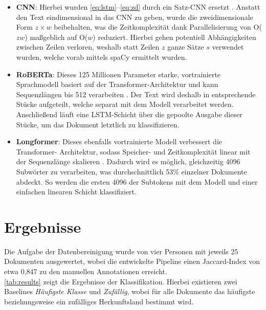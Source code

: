 \documentclass[bachelor,german]{info1thesis}
\begin{document}
\begin{itemize}
\item \textbf{CNN}: Hierbei wurden \autoref{eq:lstm}--\ref{eq:zd} durch ein Satz-CNN ersetzt \cite{Kim2014}. Anstatt den Text eindimensional in das CNN zu geben, wurde die zweidimensionale Form $z \times w$ beibehalten, was die Zeitkomplexität dank Parallelisierung von O($zw$) maßgeblich auf O($w$) reduziert. Hierbei gehen potentiell Abhängigkeiten zwischen Zeilen verloren, weshalb statt Zeilen $z$ ganze Sätze $s$ verwendet wurden, welche vorab mittels spaCy ermittelt wurden.
\item \textbf{RoBERTa}: Dieses 125 Millionen Parameter starke, vortrainierte Sprachmodell basiert auf der Transformer-Architektur und kann Sequenzlängen bis 512 verarbeiten \cite{Liu2019}. Der Text wird deshalb in entsprechende Stücke aufgeteilt, welche separat mit dem Modell verarbeitet werden. Anschließend läuft eine LSTM-Schicht über die gepoolte Ausgabe dieser Stücke, um das Dokument letztlich zu klassifizieren.
\item \textbf{Longformer}: Dieses ebenfalls vortrainierte Modell verbessert die Transformer- Architektur, sodass Speicher- und Zeitkomplexität linear mit der Sequenzlänge skalieren \cite{Beltagy2020}. Dadurch wird es möglich, gleichzeitig 4096 Subwörter zu verarbeiten, was durchschnittlich 53\% einzelner Dokumente abdeckt. So werden die ersten 4096 der Subtokens mit dem Modell und einer einfachen linearen Schicht klassifiziert. 
\end{itemize}
%


\chapter{Ergebnisse}

Die Aufgabe der Datenbereinigung wurde von vier Personen mit jeweils 25 Dokumenten ausgewertet, wobei die entwickelte Pipeline einen Jaccard-Index von etwa 0,847 zu den manuellen Annotationen erreicht. \\\autoref{tab:results} zeigt die Ergebnisse der Klassifikation. Hierbei existieren zwei Baselines \textit{Häufigste Klasse} und \textit{Zufällig}, wobei für alle Dokumente das häufigste beziehungsweise ein zufälliges Herkunftsland bestimmt wird.
\end{document}
